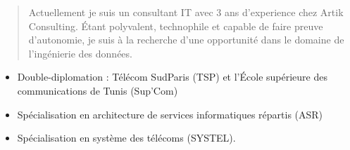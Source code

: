 \documentclass[9pt,a4paper,ragged2e,normalphoto]{altacv}
\begin{document}

\begin{fullwidth}
\makecvheader
\end{fullwidth}


\begin{quote}
Actuellement je suis un consultant IT avec 3 ans d'experience chez Artik Consulting.
Étant polyvalent, technophile et capable de faire preuve d'autonomie, je suis à la recherche d'une opportunité  dans le domaine de l'ingénierie des données.
\end{quote}



\begin{itemize}
\item Double-diplomation : Télécom SudParis (TSP) et l'École supérieure des communications de Tunis (Sup'Com)
\item Spécialisation en architecture de services informatiques répartis (ASR)
\item Spécialisation en système des télécoms (SYSTEL).
\end{itemize}

\begin{comment}

\cvevent{e}{Institut Préparatoire aux Études d'Ingénieurs El Manar (IPEIEM), Tunisie}{Septembre 2014 -- Juin 2016}{}
\begin{itemize}
\item Diplôme d'études universitaires de premier cycle en MP.
\end{itemize}
\divider

\cvevent{Baccalauréat}{Lycée les pères blancs, Tunisie}{juin 2014}{}
\begin{itemize}
\item Section: Mathématique - Moyenne: 15.96/20
\end{itemize}

\end{comment}
\end{document}
